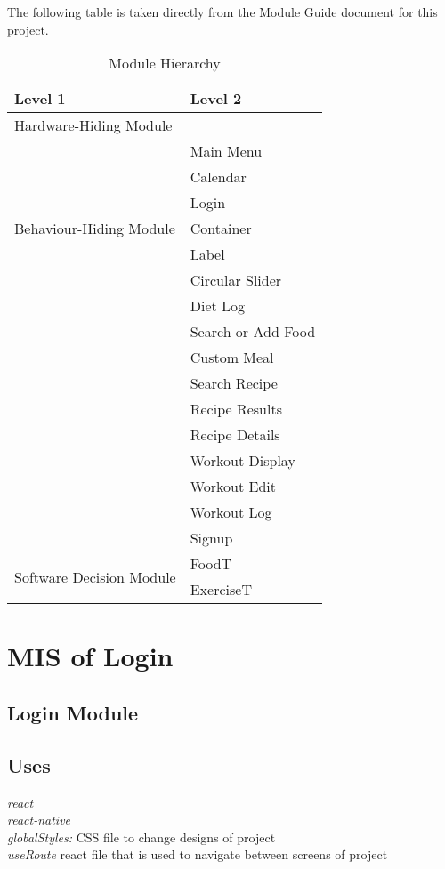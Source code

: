 \documentclass[12pt, titlepage]{article}
\begin{document}
The following table is taken directly from the Module Guide document for this project.

\begin{table}[h!]
	\centering
	\begin{tabular}{p{} p{}}
		\toprule
		\textbf{Level 1} & \textbf{Level 2}\\
		\midrule
		
		{Hardware-Hiding Module} & ~ \\
		\midrule
		
		\multirow{7}{0.3\textwidth}{Behaviour-Hiding Module} & Main Menu\\
		& Calendar\\
		& Login\\
		& Container\\
		& Label\\
		& Circular Slider\\
		& Diet Log\\ 
		& Search or Add Food\\
		& Custom Meal\\
		& Search Recipe\\
		& Recipe Results\\
		& Recipe Details\\
		& Workout Display\\
		& Workout Edit\\
		& Workout Log\\
		& Signup\\
		\midrule
		
		\multirow{3}{0.3\textwidth}{Software Decision Module} & FoodT\\
		& ExerciseT\\
		\bottomrule
		
	\end{tabular}
	\caption{Module Hierarchy}
	\label{TblMH}
\end{table}

\newpage

\section{MIS of Login} \label{Module} 

\subsection{Login Module}

\subsection{Uses}
{\textit{react}}\\
{\textit{react-native}}\\
{\textit{globalStyles:} CSS file to change designs of project}\\
{\textit{useRoute} react file that is used to navigate between screens of project}
\end{document}
